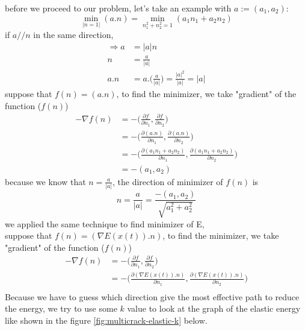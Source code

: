 \documentclass[a4paper,11pt]{article}
\begin{document}
before we proceed to our problem, let's take an example with $a:=(a_1,a_2)$:
\begin{equation}
\min_{|n=1|}(a.n) = \min_{n_1^2 + n_2^2 = 1}(a_1n_1 + a_2n_2)
\end{equation}
if $a//n$ in the same direction,
\begin{equation}
\begin{aligned}
\Rightarrow a &= |a|n\\
n&=\frac{a}{|a|}\\
a.n &= a.\bigg(\frac{a}{|a|}\bigg) =\frac{|a|^2}{|a|} = |a|
\end{aligned}
\end{equation}
suppose that $f(n) = (a.n)$, to find the minimizer, we take "gradient" of the function ($f(n)$)
\begin{equation}
\begin{aligned}
-\nabla f(n) &= - \bigg(\frac{\partial f}{\partial n_1}, \frac{\partial f}{\partial n_2} \bigg)\\
&= - \bigg( \frac{\partial (a.n)}{\partial n_1}, \frac{\partial (a.n)}{\partial n_2} \bigg)\\
&= - \bigg( \frac{\partial (a_1n_1 + a_2n_2)}{\partial n_1}, \frac{\partial (a_1n_1 + a_2n_2)}{\partial n_2} \bigg)\\
&= - (a_1,a_2)
\end{aligned}
\end{equation}
because we know that $n=\frac{a}{|a|}$, the direction of minimizer of $f(n)$ is
\begin{equation}
n = \frac{a}{|a|} = \frac{-(a_1,a_2)}{\sqrt{a_1^2 + a_2^2}}
\end{equation}
we applied the same technique to find minimizer of E,\\
suppose that $f(n) = (\nabla E(x(t)).n)$, to find the minimizer, we take "gradient" of the function ($f(n)$)
\begin{equation}
\begin{aligned}
-\nabla f(n) &= - \bigg(\frac{\partial f}{\partial n_1}, \frac{\partial f}{\partial n_2} \bigg)\\
&= - \bigg( \frac{\partial (\nabla E(x(t)).n)}{\partial n_1}, \frac{\partial (\nabla E(x(t)).n)}{\partial n_2} \bigg)\\
\end{aligned}
\end{equation}
Because we have to guess which direction give the most effective path to reduce the energy, we try to use some $k$ value to look at the graph of the elastic energy like shown in the figure \ref{fig:multicrack-elastic-k} below.
\end{document}
